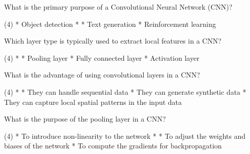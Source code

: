 \documentclass[10pt]{extarticle}
\begin{document}
\begin{exercise}
    What is the primary purpose of a Convolutional Neural Network (CNN)?
    \begin{choice} (4)
        * Object detection
        * 
        * Text generation
        * Reinforcement learning
    \end{choice}
\end{exercise}
\begin{solution}
\end{solution}

\begin{exercise}
    Which layer type is typically used to extract local features in a CNN?
    \begin{choice} (4)
        * 
        * Pooling layer
        * Fully connected layer
        * Activation layer
    \end{choice}
\end{exercise}
\begin{solution}
\end{solution}

\begin{exercise}
    What is the advantage of using convolutional layers in a CNN?
    \begin{choice} (4)
        * 
        * They can handle sequential data
        * They can generate synthetic data
        * They can capture local spatial patterns in the input data
    \end{choice}
\end{exercise}
\begin{solution}
\end{solution}

\begin{exercise}
    What is the purpose of the pooling layer in a CNN?
    \begin{choice} (4)
        * To introduce non-linearity to the network
        * 
        * To adjust the weights and biases of the network
        * To compute the gradients for backpropagation
    \end{choice}
\end{exercise}
\begin{solution}
\end{solution}
\end{document}
